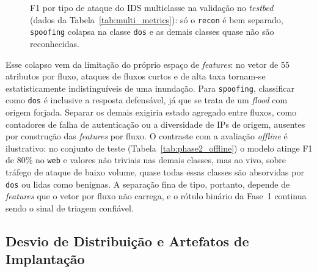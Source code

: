 \documentclass[12pt]{article}
\begin{document}
\begin{figure}[ht]
\centering
{}
\caption{F1 por tipo de ataque do IDS multiclasse na validação no
\textit{testbed} (dados da Tabela~\ref{tab:multi_metrics}): só o \texttt{recon} é
bem separado, \texttt{spoofing} colapsa na classe \texttt{dos} e as demais
classes quase não são reconhecidas.}
\label{fig:multi_f1}
\end{figure}


Esse colapso vem da limitação do próprio espaço de \textit{features}: no vetor de
55 atributos por fluxo, ataques de fluxos curtos e de alta taxa tornam-se
estatisticamente indistinguíveis de uma inundação. Para \texttt{spoofing},
classificar como \texttt{dos} é inclusive a resposta defensável, já que se trata
de um \textit{flood} com origem forjada. Separar os demais exigiria estado
agregado entre fluxos, como contadores de falha de autenticação ou a diversidade
de IPs de origem, ausentes por construção das \textit{features} por fluxo. O
contraste com a avaliação \textit{offline} é ilustrativo: no conjunto de teste
(Tabela~\ref{tab:phase2_offline}) o modelo atinge F1 de 80\% no \texttt{web} e
valores não triviais nas demais classes, mas ao vivo, sobre tráfego de ataque de
baixo volume, quase todas essas classes são absorvidas por \texttt{dos} ou lidas
como benignas. A separação fina de tipo, portanto, depende de \textit{features}
que o vetor por fluxo não carrega, e o rótulo binário da Fase~1 continua sendo o
sinal de triagem confiável.

\subsection{Desvio de Distribuição e Artefatos de Implantação}
\label{subsec:res_artefatos}
\end{document}
